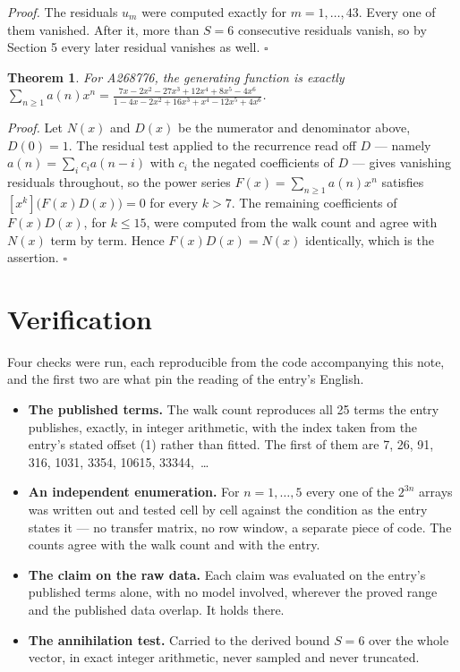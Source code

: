 \documentclass[11pt]{article}
\newtheorem{theorem}{Theorem}
\theoremstyle{definition}
\begin{document}
{\itshape Proof.} The residuals $u_m$ were computed exactly for $m = 1,\dots,43$. Every one of them vanished. After it, more than $S = 6$ consecutive residuals vanish, so by Section 5 every later residual vanishes as well. $\square$

\begin{theorem} For A268776, the generating function is exactly $\sum_{n\ge 1} a(n)x^n = \frac{7x - 2x^{2} - 27x^{3} + 12x^{4} + 8x^{5} - 4x^{6}}{1 - 4x - 2x^{2} + 16x^{3} + x^{4} - 12x^{5} + 4x^{6}}$.\end{theorem}

{\itshape Proof.} Let $N(x)$ and $D(x)$ be the numerator and denominator above, $D(0)=1$. The residual test applied to the recurrence read off $D$ --- namely $a(n) = \sum_i c_i a(n-i)$ with $c_i$ the negated coefficients of $D$ --- gives vanishing residuals throughout, so the power series $F(x)=\sum_{n\ge 1}a(n)x^n$ satisfies $[x^k]\bigl(F(x)D(x)\bigr) = 0$ for every $k > 7$. The remaining coefficients of $F(x)D(x)$, for $k \le 15$, were computed from the walk count and agree with $N(x)$ term by term. Hence $F(x)D(x) = N(x)$ identically, which is the assertion. $\square$

\section{Verification}

Four checks were run, each reproducible from the code accompanying this note, and the first two are what pin the reading of the entry's English.

\begin{itemize}

\item {\bfseries The published terms.} The walk count reproduces all 25 terms the entry publishes, exactly, in integer arithmetic, with the index taken from the entry's stated offset (1) rather than fitted. The first of them are 7, 26, 91, 316, 1031, 3354, 10615, 33344,~\dots

\item {\bfseries An independent enumeration.} For $n = 1,\dots,5$ every one of the $2^{3n}$ arrays was written out and tested cell by cell against the condition as the entry states it --- no transfer matrix, no row window, a separate piece of code. The counts agree with the walk count and with the entry.

\item {\bfseries The claim on the raw data.} Each claim was evaluated on the entry's published terms alone, with no model involved, wherever the proved range and the published data overlap. It holds there.

\item {\bfseries The annihilation test.} Carried to the derived bound $S = 6$ over the whole vector, in exact integer arithmetic, never sampled and never truncated.

\end{itemize}
\end{document}
